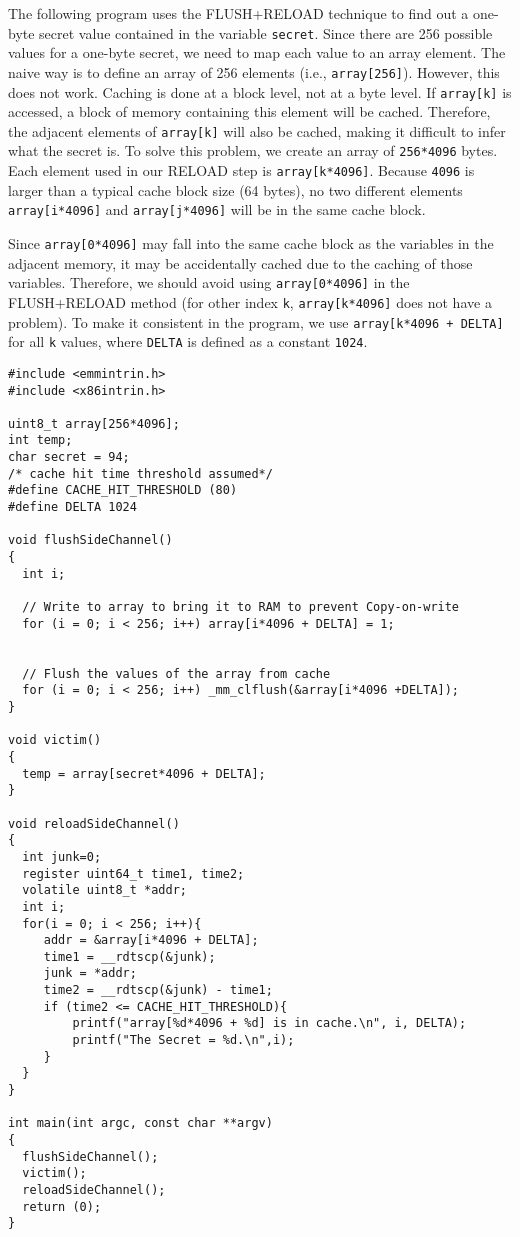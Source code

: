 The following program uses the FLUSH+RELOAD technique to 
find out a one-byte secret value contained in the variable \texttt{secret}. 
Since there are 256 possible values for a one-byte secret, we 
need to map each value to an array element. The naive way is to define an
array of 256 elements (i.e., \texttt{array[256]}).  However, this does not
work. Caching is done at a block level, not at a byte level. If
\texttt{array[k]} is accessed, a block of memory containing this element  
will be cached. Therefore, the adjacent elements of \texttt{array[k]} 
will also be cached, making it difficult to infer what the secret is. 
To solve this problem, we create an array of \texttt{256*4096} 
bytes. Each element used in our RELOAD step is \texttt{array[k*4096]}. 
Because \texttt{4096} is larger than a typical cache block size (64 bytes), 
no two different elements \texttt{array[i*4096]} and \texttt{array[j*4096]} will
be in the same cache block.

Since \texttt{array[0*4096]} may fall into the same cache block as the variables 
in the adjacent memory, it may be accidentally cached due to the caching 
of those variables. Therefore, we should avoid using \texttt{array[0*4096]} in
the FLUSH+RELOAD method (for other index \texttt{k}, \texttt{array[k*4096]} does not
have a problem).
To make it consistent in the program, we use 
\texttt{array[k*4096 + DELTA]} for all \texttt{k} values, 
where \texttt{DELTA} is defined as a constant \texttt{1024}. 


\begin{lstlisting}[caption=\texttt{FlushReload.c}, label={sidechannel:list:flushreload}]
#include <emmintrin.h>
#include <x86intrin.h>

uint8_t array[256*4096];
int temp;
char secret = 94;
/* cache hit time threshold assumed*/
#define CACHE_HIT_THRESHOLD (80)
#define DELTA 1024

void flushSideChannel()
{
  int i;

  // Write to array to bring it to RAM to prevent Copy-on-write
  for (i = 0; i < 256; i++) array[i*4096 + DELTA] = 1;


  // Flush the values of the array from cache
  for (i = 0; i < 256; i++) _mm_clflush(&array[i*4096 +DELTA]);
}

void victim()
{
  temp = array[secret*4096 + DELTA];
}

void reloadSideChannel() 
{
  int junk=0;
  register uint64_t time1, time2;
  volatile uint8_t *addr;
  int i;
  for(i = 0; i < 256; i++){
     addr = &array[i*4096 + DELTA];
     time1 = __rdtscp(&junk);
     junk = *addr;
     time2 = __rdtscp(&junk) - time1;
     if (time2 <= CACHE_HIT_THRESHOLD){
         printf("array[%d*4096 + %d] is in cache.\n", i, DELTA);
         printf("The Secret = %d.\n",i);
     }
  }	
}

int main(int argc, const char **argv) 
{
  flushSideChannel();
  victim();
  reloadSideChannel();
  return (0);
}
\end{lstlisting}
 

